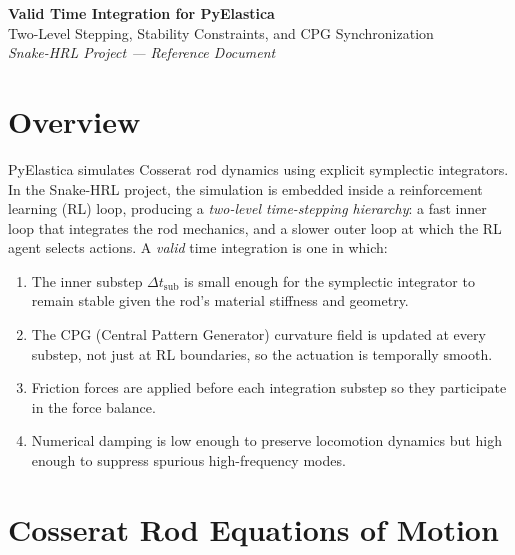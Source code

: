 \documentclass[11pt]{article}
\newcommand{\dtsub}{\Delta t_{\mathrm{sub}}}
\begin{document}

\begin{center}
  {\Large\bfseries Valid Time Integration for PyElastica} \\[0.5em]
  {\large Two-Level Stepping, Stability Constraints, and CPG Synchronization} \\[1.5em]
  \textit{Snake-HRL Project --- Reference Document}
\end{center}

\vspace{1em}

\section{Overview}
\label{sec:overview}

PyElastica simulates Cosserat rod dynamics using explicit symplectic integrators.
In the Snake-HRL project, the simulation is embedded inside a reinforcement learning
(RL) loop, producing a \emph{two-level time-stepping hierarchy}: a fast inner loop
that integrates the rod mechanics, and a slower outer loop at which the RL agent
selects actions.  A \emph{valid} time integration is one in which:
\begin{enumerate}[nosep]
  \item The inner substep $\dtsub$ is small enough for the symplectic integrator
        to remain stable given the rod's material stiffness and geometry.
  \item The CPG (Central Pattern Generator) curvature field is updated at every
        substep, not just at RL boundaries, so the actuation is temporally smooth.
  \item Friction forces are applied before each integration substep so they
        participate in the force balance.
  \item Numerical damping is low enough to preserve locomotion dynamics but
        high enough to suppress spurious high-frequency modes.
\end{enumerate}

\section{Cosserat Rod Equations of Motion}
\label{sec:eom}
\end{document}
